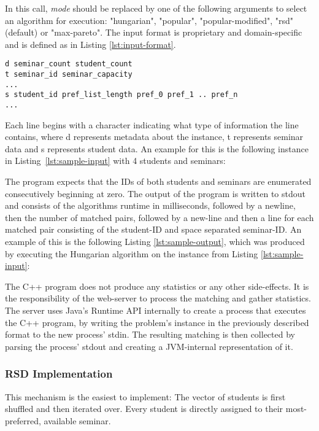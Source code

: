 In this call, \emph{mode} should be replaced by one of the following arguments to select an algorithm for execution: "hungarian", "popular", "popular-modified", "rsd" (default) or "max-pareto". The input format is proprietary and domain-specific and is defined as in Listing \ref{lst:input-format}.

\begin{lstlisting}[frame=single, float, label=lst:input-format, caption={Program input format},captionpos=b]
d seminar_count student_count
t seminar_id seminar_capacity
...
s student_id pref_list_length pref_0 pref_1 .. pref_n
...
\end{lstlisting}

Each line begins with a character indicating what type of information the line contains, where d represents metadata about the instance, t represents seminar data and s represents student data. An example for this is the following instance in \mbox{Listing \ref{lst:sample-input}} with 4 students and seminars:


The program expects that the IDs of both students and seminars are enumerated consecutively beginning at zero. The output of the program is written to stdout and consists of the algorithms runtime in milliseconds, followed by a newline, then the number of matched pairs, followed by a new-line and then a line for each matched pair consisting of the student-ID and space separated seminar-ID. An example of this is the following Listing \ref{lst:sample-output}, which was produced by executing the Hungarian algorithm on the instance from Listing \ref{lst:sample-input}:


The C++ program does not produce any statistics or any other side-effects. It is the responsibility of the web-server to process the matching and gather statistics. The server uses Java's Runtime API internally to create a process that executes the C++ program, by writing the problem's instance in the previously described format to the new process' stdin. The resulting matching is then collected by parsing the process' stdout and creating a JVM-internal representation of it. 

\subsubsection{RSD Implementation}
This mechanism is the easiest to implement: The vector of students is first shuffled and then iterated over. Every student is directly assigned to their most-preferred, available seminar.


